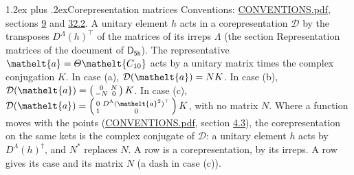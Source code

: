 \documentclass[10pt,a4paper]{article}
\makeatletter
\renewcommand\section{\@startsection{section}{1}{\z@}{-3ex plus -1ex minus -.2ex}%
  {1.2ex plus .2ex}{\normalfont\large\sffamily\bfseries\color{parttitle}}}
\numberwithin{equation}{section}
\newcommand{\eltfont}[1]{{\let\sigma\eltsigma\mathelt{#1}}}
\newcommand{\grp}[1]{\mathsf{#1}}
\newcommand{\elt}[1]{\eltfont{#1}}
\makeatother
\begin{document}
\section{Corepresentation matrices}\label{s:corep_matrices}
Conventions: \href{../../CONVENTIONS.pdf}{CONVENTIONS.pdf}, sections \href{../../../rotation/CONVENTIONS.pdf\#conv.9}{9} and \href{../../CONVENTIONS.pdf\#conv.32.2}{32.2}.
A unitary element $h$ acts in a corepresentation $\mathcal{D}$ by the transposes $D^{\Lambda}(h)^{\top}$ of the matrices of its irreps $\Lambda$ (the section Representation matrices of the document of \href{../../../rotation/data/pdf/D5h.pdf}{$\grp{D_{5h}}$}). The representative $\elt{a} = \varTheta\elt{C_{10}}$ acts by a unitary matrix times the complex conjugation $K$.
In case (a), $\mathcal{D}(\elt{a}) = NK$. In case (b), $\mathcal{D}(\elt{a}) = \left(\begin{smallmatrix} 0 & N \\ -N & 0 \end{smallmatrix}\right) K$. In case (c), $\mathcal{D}(\elt{a}) = \left(\begin{smallmatrix} 0 & D^{\Lambda}(\elt{a}^2)^{\top} \\ 1 & 0 \end{smallmatrix}\right) K$, with no matrix $N$.
Where a function moves with the points (\href{../../CONVENTIONS.pdf}{CONVENTIONS.pdf}, section \href{../../../rotation/CONVENTIONS.pdf\#conv.4.3}{4.3}), the corepresentation on the same kets is the complex conjugate of $\mathcal{D}$: a unitary element $h$ acts by $D^{\Lambda}(h)^{\dagger}$, and $N^{*}$ replaces $N$.
A row is a corepresentation, by its irreps. A row gives its case and its matrix $N$ (a dash in case (c)).
\end{document}
